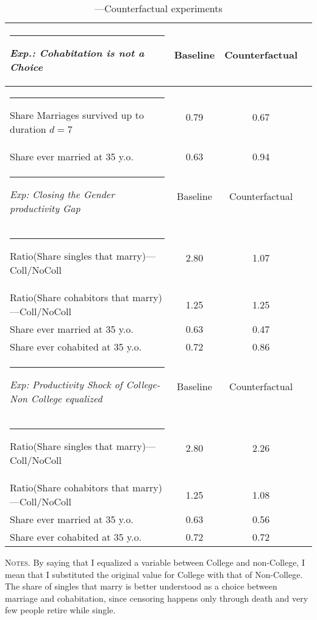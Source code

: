 \documentclass[12pt]{article}
\begin{document}
 \begin{table}[h!]\footnotesize
	\centering
	\begin{threeparttable}\centering\footnotesize
		\caption{---Counterfactual experiments} %
		\label{table:exp} %
		\centering %
		\begin{tabular}{@{} l c c c  @{}}  %
			\hline\hline %
			\rule{-4pt}{2.5ex}
			\textit{Exp.: Cohabitation is not a Choice} & Baseline  & Counterfactual  \\ [0.05ex] %
			\hline %
			\rule{-4pt}{2.5ex}
			Share Marriages survived up to duration $d=7$   & 0.79 & 0.67 & \\[0.15ex]
			Share ever married at 35 y.o.                        & 0.63 & 0.94 & \\[0.15ex]
			\hline \hline%
			\rule{-4pt}{2.5ex}
			\textit{Exp: Closing the Gender productivity Gap}& Baseline  & Counterfactual  \\ [0.05ex] %
			\hline 
			\rule{-4pt}{2.5ex}
			Ratio(Share singles that marry)---Coll/NoColl  & 2.80 & 1.07 \\[0.15ex]
			Ratio(Share cohabitors that marry)---Coll/NoColl   & 1.25 & 1.25 \\[0.15ex]
			Share ever married at 35 y.o.   & 0.63 & 0.47 \\[0.15ex]
			Share ever cohabited at 35 y.o.   & 0.72 & 0.86\\[0.15ex]
			\hline \hline
			\rule{-4pt}{2.5ex}
			\textit{Exp: Productivity Shock of College-Non College equalized}& Baseline  & Counterfactual  \\ [0.05ex] %
			\hline 
			\rule{-4pt}{2.5ex}
			Ratio(Share singles that marry)---Coll/NoColl  & 2.80 & 2.26 \\[0.15ex]
			Ratio(Share cohabitors that marry)---Coll/NoColl   & 1.25& 1.08 \\[0.15ex]
			Share ever married at 35 y.o.   & 0.63 & 0.56 \\[0.15ex]
			Share ever cohabited at 35 y.o.   & 0.72 & 0.72 \\[0.15ex]
			\hline \hline
		\end{tabular}
		\begin{tablenotes}[flushleft]
			\scriptsize{\item \textsc{Notes.} By saying that I equalized a variable between College and non-College, I mean that I substituted the original value for College with that of Non-College. The share of singles that marry is better understood as a choice between marriage and cohabitation, since censoring happens only through death and very few people retire while single.}
		\end{tablenotes}
	\end{threeparttable}
\end{table}
\FloatBarrier
 
\end{document}
